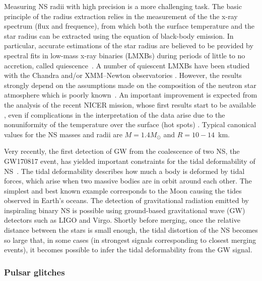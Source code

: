 Measuring NS radii with high precision is a more challenging task.
The basic principle of the radius extraction relies in the measurement of the 
the x-ray spectrum (flux and frequence), from which both the surface 
temperature and the star radius can be extracted using the equation of 
black-body emission.
In particular, accurate estimations of the star radius are believed to be 
provided by spectral fits in low-mass x-ray binaries (LMXBs) during periods of 
little to no accretion, called quiescence~\cite{Brown1998}.
%
A number of quiescent LMXBs have been studied with the Chandra and/or 
XMM–Newton 
observatories \cite{Heinke2014,Servillat2012,Guillot2014,Guillot2013}.
%
However, the results strongly depend on the assumptions made on the composition
of the neutron star atmosphere which is poorly known~\cite{Steiner2018}. 
An important improvement is expected from the analysis of the recent NICER 
mission, whose first results start to be available 
\cite{Bogdanov2019a,Bogdanov2019b,Miller2019,Raaijmakers2019,Riley2019}, 
even if complications in the interpretation of the 
data arise due to the nonuniformity of the temperature over the surface (hot
spots) \cite{Bogdanov2019a,Bogdanov2019b,Miller2019,Raaijmakers2019,Riley2019}. 
Typical canonical values for the NS masses and radii are $M = 1.4M_\odot$ and
$R=10-14$~km.
 
Very recently, the first detection of GW from the coalescence of two NS, 
the GW170817 event, has yielded important constraints for the tidal 
deformability of NS~\cite{GW1}.
The tidal deformability describes how much a body is deformed by tidal forces,
which arise when two massive bodies are in orbit around each other. 
The simplest and best known example corresponds to the Moon causing the tides 
observed in Earth's oceans.
The detection of gravitational radiation emitted by inspiraling binary NS 
is possible using ground-based gravitational wave (GW) detectors such as LIGO 
and Virgo. 
Shortly before merging, once the relative distance between the stars is small
enough, the tidal distortion of the NS becomes so large that, in some cases (in
strongest signals corresponding to closest merging events), it becomes possible 
to infer the tidal deformability from the GW signal. 

\subsubsection*{Pulsar glitches}


